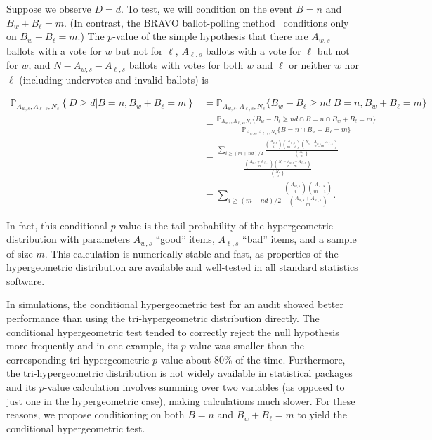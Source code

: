 Suppose we observe $D=d$.
To test, we will condition on the event $B=n$ and $B_w +B_\ell = m$. 
(In contrast, the BRAVO ballot-polling
method~\citep{lindemanEtal12}
conditions only on $B_w+B_\ell = m$.)
The $p$-value of the simple hypothesis that there are $A_{w,s}$ ballots with
a vote for $w$ but not for $\ell$, $A_{\ell,s}$ ballots with a vote for $\ell$ but not for $w$, 
and $N - A_{w,s} - A_{\ell,s}$ ballots with votes for both $w$ and $\ell$ or neither $w$ nor $\ell$ (including undervotes and
invalid ballots) is

\begin{equation}
\begin{aligned}
   \mathbb{P}_{A_{w,s}, A_{\ell,s}, N_s} \left \{ D \geq d \vert B = n, B_w+B_\ell = m \right \} 
  & = \mathbb{P}_{A_{w,s}, A_{\ell,s}, N_s}\{ B_w - B_\ell \geq nd \vert B = n, B_w+B_\ell = m \} \\
  & = \frac{\mathbb{P}_{A_{w,s}, A_{\ell,s}, N_s}\{ B_w - B_\ell \geq nd \cap B = n \cap B_w+B_\ell = m \} }{ \mathbb{P}_{A_{w,s}, A_{\ell,s}, N_s}\{  B = n \cap B_w+B_\ell = m \} }\\
   & = \frac{ 
   \sum_{i \geq (m+nd)/2} 
         \frac{ {A_{w,s} \choose i}{A_{\ell,s} \choose m-i}{N_s - A_{w,s} - A_{\ell,s} \choose n-m}}{{N_s \choose n}} }{
         \frac{ {A_{w,s} + A_{\ell, s} \choose m}{N_s - A_{w,s} - A_{\ell,s} \choose n-m}}{{N_s \choose n}}} \\
     & = \sum_{i \geq (m+nd)/2} \frac{ {A_{w,s} \choose i}{A_{\ell,s} \choose m-i} }{{A_{w,s} + A_{\ell, s} \choose m}}.
\end{aligned}
\end{equation}

In fact, this conditional $p$-value is the tail probability of the hypergeometric distribution
with parameters $A_{w,s}$ ``good'' items, $A_{\ell,s}$ ``bad'' items, and a sample of size $m$.
This calculation is numerically stable and fast, as properties of the hypergeometric distribution are available
and well-tested in all standard statistics software.

In simulations, the conditional hypergeometric test for an audit showed better performance than
using the tri-hypergeometric distribution directly.
The conditional hypergeometric test tended to correctly reject the null hypothesis more frequently and in one example, its $p$-value was
smaller than the corresponding tri-hypergeometric $p$-value about 80\% of the time.
Furthermore, the tri-hypergeometric distribution is not widely available in statistical packages and its $p$-value calculation involves 
summing over two variables (as opposed to just one in the hypergeometric case), making calculations much slower.
For these reasons, we propose conditioning on both $B=n$ and $B_w+B_\ell=m$ to yield the conditional hypergeometric test.

